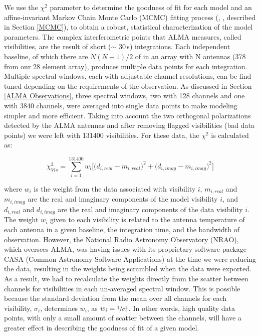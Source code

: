 We use the $\chi^{2}$ parameter to determine the goodness of fit for each model and an affine-invariant Markov Chain Monte Carlo (MCMC) fitting process (\cite{Fore13}, \cite{Good10}, described in Section \ref{MCMC}), to obtain a robust, statistical characterization of the model parameters. The complex interferometric points that ALMA measures, called visibilities, are the result of short ($\sim$ 30\,s) integrations. Each independent baseline, of which there are $N(N-1)/2$ of in an array with N antennas (378 from our 28 element array), produces multiple data points for each integration. Multiple spectral windows, each with adjustable channel resolutions, can be find tuned depending on the requirements of the observation. As discussed in Section \ref{ALMA Observations}, three spectral windows, two with 128 channels and one with 3840 channels, were averaged into single data points to make modeling simpler and more efficient. Taking into account the two orthogonal polarizations detected by the ALMA antennas and after removing flagged visibilities (bad data points) we were left with 131400 visibilities. For these data, the $\chi^{2}$ is calculated as:

\begin{equation}
\chi^{2}_{Vis} =  \sum_{i=1}^{131400} w_{i} \bigg[\bigg(d_{i,real} - m_{i,real}\bigg)^{2} + \bigg(d_{i,imag} - m_{i,imag}\bigg)^{2}\bigg] 
\end{equation} 

where $w_{i}$ is the weight from the data associated with visibility $i$, $m_{i,real}$ and $m_{i,imag}$ are the real and imaginary components of the model visibility $i$, and $d_{i,real}$ and $d_{i,imag}$ are the real and imaginary components of the data visibility $i$. The weight $w_{i}$ given to each visibility is related to the antenna temperature of each antenna in a given baseline, the integration time, and the bandwidth of observation. However, the National Radio Astronomy Observatory (NRAO), which oversees ALMA, was having issues with its proprietary software package CASA (Common Astronomy Software Applications) at the time we were reducing the data, resulting in the weights being scrambled when the data were exported. As a result, we had to recalculate the weights directly from the scatter between channels for visibilities in each un-averaged spectral window. This is possible because the standard deviation from the mean over all channels for each visibility, $\sigma_{i}$, determines $w_{i}$, as $w_{i} = \sfrac{1}{\sigma_{i}^{2}}$. In other words, high quality data points, with only a small amount of scatter between the channels, will have a greater effect in describing the goodness of fit of a given model. 

